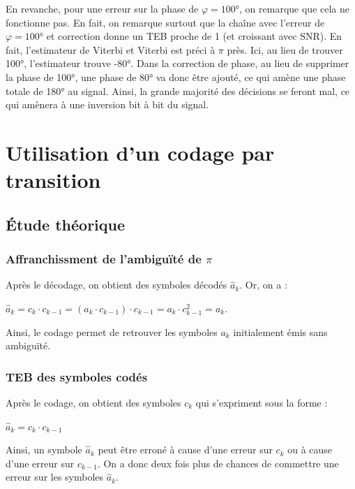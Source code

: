 \documentclass[11pt,a4paper]{report}
\begin{document}
En revanche, pour une erreur sur la phase de $\varphi = 100$°, on remarque que cela ne fonctionne pas. En fait, on remarque surtout que la chaîne avec l'erreur de $\varphi = 100$° et correction donne un TEB proche de 1 (et croissant avec SNR). En fait, l'estimateur de Viterbi et Viterbi est préci à $\pi$ près. Ici, au lieu de trouver 100°, l'estimateur trouve -80°. Dans la correction de phase, au lieu de supprimer la phase de 100°, une phase de 80° va donc être ajouté, ce qui amène une phase totale de 180° au signal. Ainsi, la grande majorité des décisions se feront mal, ce qui amènera à une inversion bit à bit du signal.



\part{Utilisation d’un codage par transition}

\chapter{Étude théorique}

\section{Affranchissment de l'ambiguïté de $\pi$}

Après le décodage, on obtient des symboles décodés $\hat{a}_k$. Or, on a :

\begin{center}
    $\hat{a}_k = c_k \cdot c_{k-1} = (a_k \cdot c_{k-1}) \cdot c_{k-1} = a_k \cdot c_{k-1}^2 = a_k$.
\end{center}

Ainsi, le codage permet de retrouver les symboles $a_k$ initialement émis sans ambiguïté. 

\section{TEB des symboles codés}

Après le codage, on obtient des symboles $c_k$ qui s'expriment sous la forme :

\begin{center}
    $\hat{a}_k = c_k \cdot c_{k-1}$
\end{center}

Ainsi, un symbole $\hat{a}_k$ peut être erroné à cause d'une erreur sur $c_k$ ou à cause d'une erreur sur  $c_{k-1}$. On a donc deux fois plus de chances de commettre une erreur sur les symboles $\hat{a}_k$.
\end{document}
